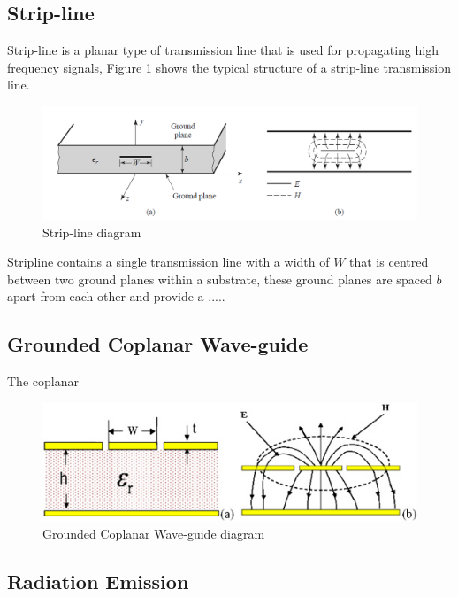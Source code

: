 \documentclass[12pt,openany,a4paper]{book}
\begin{document}
\subsection{Strip-line}
Strip-line is a planar type of transmission line that is used for propagating high frequency signals, Figure \ref{fig:striplinediag} shows the typical structure of a strip-line transmission line.
\begin{figure}[H]
	\centering
    \includegraphics[width=1\textwidth]{stripline-2.png}
	\caption{Strip-line diagram}
	\label{fig:striplinediag}
\end{figure} 
Stripline contains a single transmission line with a width of $W$ that is centred between two ground planes within a substrate, these ground planes are spaced $b$ apart from each other and provide a ..... \cite{ref9}


\subsection{Grounded Coplanar Wave-guide}
The coplanar 


\begin{figure}[H]
	\centering
    \includegraphics[width=1\textwidth]{cpwg-diag.jpg}
	\caption{Grounded Coplanar Wave-guide diagram}
	\label{fig:gcpwg}
\end{figure} 










\subsection{Radiation Emission}
\end{document}
